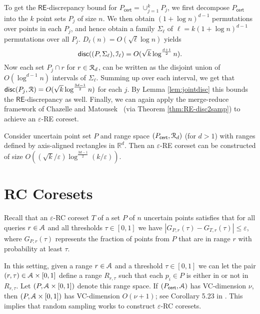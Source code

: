 \documentclass[11pt]{myclass}
\newcommand{\eps}{\varepsilon}
\newcommand{\Eu}[1]{\ensuremath{\EuScript{#1}}}
\newcommand{\bl}[1]{\ensuremath{\mathbb{#1}}}
\newcommand{\disc}{\textsf{disc}}
\newcommand{\cert}{\textsf{cert}}
\newcommand{\RC}{\textsf{RC}\xspace}
\newcommand{\RE}{\textsf{RE}\xspace}
\begin{document}
To get the $\RE$-discrepancy bound for $P_{\cert} = \cup_{j=1}^k P_j$, we first decompose $P_{\cert}$ into the $k$ point sets $P_j$ of size $n$.
We then obtain ${(1 + \log n )}^{d-1}$ permutations over points in each $P_j$, and hence obtain a family $\Sigma_\ell$ of $\ell = {k (1 + \log n )}^{d-1}$ permutations over all $P_j$. $D_\ell(n) = O(\sqrt{\ell} \log n)$ yields 
\[
\disc((P, \Sigma_\ell), \Eu{I}_\ell) =  O(\sqrt{k} \log^{\frac{d+1}{2}} n).
\]
Now each set $P_j \cap r$ for $r \in \Eu{R}_d$, can be written as the disjoint union of $O{( \log^{d-1} n)}$ intervals of $\Sigma_\ell$.  Summing up over each interval, we get that 
$\disc(P_j, \Eu{R}) = O(\sqrt{k} \log^{\frac{3d-1}{2}} n)$ for each $j$.  
By Lemma \ref{lem:jointdisc} this bounds the $\RE$-discrepancy as well.
Finally, we can again apply the merge-reduce framework of Chazelle and Matousek~\cite{CM96} (via Theorem \ref{thm:RE-disc2samp}) to achieve an $\eps$-\RE coreset.  


\begin{theorem}\label{thm:highdeps-RE}
Consider uncertain point set $P$ and range space $(P_\cert, \Eu{R}_d)$ (for $d>1$) with ranges defined by axis-aligned rectangles in $\bl{R}^d$. 
Then an $\eps$-\RE coreset can be constructed of size $O((\sqrt{k}/\eps) \log^{\frac{3d-1}{2}} (k/\eps))$.
 \end{theorem}



\section{\RC Coresets}
\label{sec:RC}

Recall that an $\eps$-\RC coreset $T$ of a set $P$ of $n$ uncertain points satisfies that for all queries $r \in \Eu{A}$ and all thresholds $\tau \in [0,1]$ we have $|G_{P,r}(\tau) - G_{T,r}(\tau)| \leq \eps$, where $G_{P,r}(\tau)$ represents the fraction of points from $P$ that are in range $r$ with probability at least $\tau$.  

In this setting, given a range $r \in \Eu{A}$ and a threshold $\tau \in [0,1]$ we can let the pair $(r, \tau) \in \Eu{A} \times [0,1]$ define a range $R_{r,\tau}$ such that each $p_i \in P$ is either in or not in $R_{r,\tau}$.  Let $(P, \Eu{A} \times [0,1])$ denote this range space.   If $(P_\cert, \Eu{A})$ has VC-dimension $\nu$, then $(P, \Eu{A} \times [0,1])$ has VC-dimension $O(\nu +1)$;  see Corollary 5.23 in \cite{peled}.  This implies that random sampling works to construct $\eps$-RC coresets.  
\end{document}
